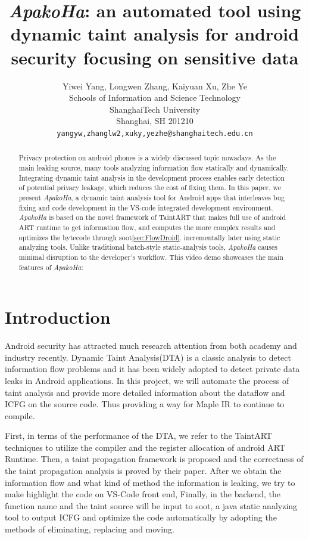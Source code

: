 \documentclass{article}
\title{\emph{ApakoHa}: an automated tool using dynamic taint analysis for android security focusing on sensitive data}
\author{
  Yiwei Yang, Longwen Zhang, Kaiyuan Xu, Zhe Ye \\
  Schools of Information and Science Technology\\
  ShanghaiTech University\\
  Shanghai, SH 201210 \\
  \texttt{yangyw,zhanglw2,xuky,yezhe@shanghaitech.edu.cn} \\
}
\begin{document}
\maketitle

\begin{abstract}
  Privacy protection on android phones is a widely discussed topic nowadays. As the main leaking source, many tools analyzing information flow statically and dynamically. Integrating dynamic taint analysis in the development process enables early detection of potential privacy leakage, which reduces the cost of fixing them.
  In this paper, we present \emph{ApakoHa}, a dynamic taint analysis tool for Android apps that interleaves bug fixing and code development in the VS-code integrated development environment. 
  \emph{ApakoHa} is based on the novel framework of TaintART that makes full use of android ART runtime to get information flow, and computes the more complex results and optimizes the bytecode through soot\ref{sec:FlowDroid}. incrementally later using static analyzing tools. Unlike traditional batch-style static-analysis tools, \emph{ApakoHa} causes minimal disruption to the developer’s workflow. This video
demo showcases the main features of \emph{ApakoHa}: 

\end{abstract}




\section{Introduction}
Android security has attracted much research attention from both academy 
            and industry recently. Dynamic Taint Analysis(DTA) is a classic analysis to detect
             information flow problems and it has been widely adopted to detect private
             data leaks in Android applications. In this project, we will automate the
             process of taint analysis and provide more detailed information about the dataflow and ICFG on the source code. Thus providing a way for Maple IR to continue to compile.

First, in terms of the performance of the DTA, we refer to the TaintART techniques to utilize the 
            compiler and the register allocation of android ART Runtime. Then, a taint propagation 
            framework is proposed and the correctness of the taint propagation analysis is proved by 
            their paper. After we obtain the information flow and what kind of method the information is leaking, we try to make highlight the code on VS-Code front end,
            Finally, in the backend, the function name and the taint source will be input to soot, a java static analyzing tool to output ICFG and optimize the code automatically  by adopting the methods of eliminating, replacing and moving.
\end{document}
